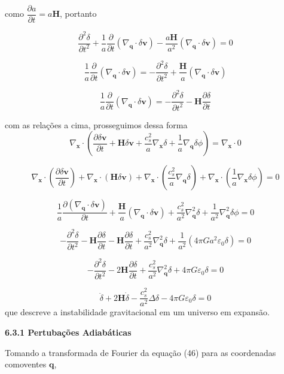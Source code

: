\documentclass[a4paper,12pt]{article}
\begin{document}
como $\dfrac{\partial a}{\partial t}=a\mathbf{H}$, portanto

$$\dfrac{\partial^2 \delta}{\partial t^2} +  \dfrac{1}{a}\dfrac{\partial}{\partial t }(\nabla_\mathbf{q}\cdot\delta\mathbf{v})-  \dfrac{a\mathbf{H}}{a^2}(\nabla_\mathbf{q}\cdot\delta\mathbf{v}) = 0$$

$$\dfrac{1}{a}\dfrac{\partial}{\partial t }(\nabla_\mathbf{q}\cdot\delta\mathbf{v})= -\dfrac{\partial^2 \delta}{\partial t^2} + \dfrac{\mathbf{H}}{a}(\nabla_\mathbf{q}\cdot\delta\mathbf{v})$$

$$\dfrac{1}{a}\dfrac{\partial}{\partial t }(\nabla_\mathbf{q}\cdot\delta\mathbf{v})= -\dfrac{\partial^2 \delta}{\partial t^2} -\mathbf{H} \dfrac{\partial\delta}{\partial t}$$

com as relações a cima, prosseguimos dessa forma
$$\nabla_\mathbf{x}\cdot\left( \dfrac{\partial \delta\mathbf{v}}{\partial t}  +\mathbf{H}\delta\mathbf{v}+\dfrac{c^2_s}{a}\nabla_\mathbf{x}\delta + \dfrac{1}{a}\nabla_\mathbf{q}\delta\phi \right)=\nabla_\mathbf{x}\cdot0$$

$$\nabla_\mathbf{x}\cdot\left( \dfrac{\partial \delta\mathbf{v}}{\partial t}  \right)+\nabla_\mathbf{x}\cdot\left( \mathbf{H}\delta\mathbf{v}\right)+\nabla_\mathbf{x}\cdot\left( \dfrac{c^2_s}{a}\nabla_\mathbf{q}\delta\right)+\nabla_\mathbf{x}\cdot\left(  \dfrac{1}{a}\nabla_\mathbf{x}\delta\phi \right)=0$$

$$\dfrac{1}{a}\dfrac{\partial (\nabla_\mathbf{q}\cdot\delta\mathbf{v})}{\partial t}  + \dfrac{\mathbf{H}}{a}(\nabla_\mathbf{q}\cdot\delta\mathbf{v}) + \dfrac{c^2_s}{a^2}\nabla^2_\mathbf{q}\delta+ \dfrac{1}{a^2}\nabla^2_\mathbf{q}\delta\phi =0$$

$$ -\dfrac{\partial^2 \delta}{\partial t^2} -\mathbf{H} \dfrac{\partial\delta}{\partial t}  -\mathbf{H}\dfrac{\partial\delta}{\partial t} + \dfrac{c^2_s}{a^2}\nabla^2_\mathbf{q}\delta+ \dfrac{1}{a^2}(4\pi Ga^2\varepsilon_0\delta)=0$$

$$ -\dfrac{\partial^2 \delta}{\partial t^2} -2\mathbf{H} \dfrac{\partial\delta}{\partial t} + \dfrac{c^2_s}{a^2}\nabla^2_\mathbf{q}\delta+ 4\pi G\varepsilon_0\delta=0$$

\begin{equation}
	\ddot{\delta} + 2\mathbf{H}\dot{\delta} - \dfrac{c^2_s}{a^2}\Delta\delta - 4\pi G\varepsilon_0\delta = 0
\end{equation}
que descreve a instabilidade gravitacional em um universo em expansão.


\begin{center}
	\textbf{6.3.1 Pertubações Adiabáticas}
\end{center}
Tomando a transformada de Fourier da equação (46) para as coordenadas comoventes $\mathbf{q}$,
\end{document}
